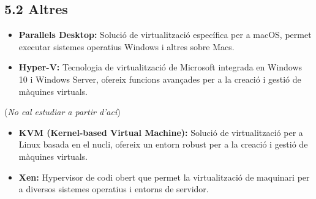 \documentclass[
  12 pt,
  a4paper,
]{article}
\providecommand{\tightlist}{%
  \setlength{\itemsep}{0pt}\setlength{\parskip}{0pt}}
\begin{document}
\subsection{5.2 Altres}\label{altres-1}

\begin{itemize}
\tightlist
\item
  \textbf{Parallels Desktop:} Solució de virtualització específica per a
  macOS, permet executar sistemes operatius Windows i altres sobre Macs.
\item
  \textbf{Hyper-V:} Tecnologia de virtualització de Microsoft integrada
  en Windows 10 i Windows Server, ofereix funcions avançades per a la
  creació i gestió de màquines virtuals.
\end{itemize}

(\emph{No cal estudiar a partir d'ací})

\begin{itemize}
\tightlist
\item
  \textbf{KVM (Kernel-based Virtual Machine):} Solució de virtualització
  per a Linux basada en el nucli, ofereix un entorn robust per a la
  creació i gestió de màquines virtuals.
\item
  \textbf{Xen:} Hypervisor de codi obert que permet la virtualització de
  maquinari per a diversos sistemes operatius i entorns de servidor.
\end{itemize}
\end{document}
